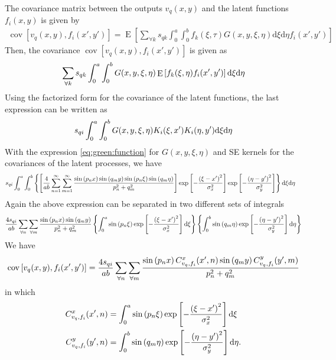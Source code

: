 \documentclass[a4paper,10pt]{article}
\newcommand{\dif}{\textrm{d}}
\DeclareMathOperator{\cov}{cov} \DeclareMathOperator{\ex}{E}
\begin{document}
The covariance matrix between the outputs $v_q(x,y)$ and the latent
functions  $f_i(x,y)$
is given by
\begin{align}
\cov\left[v_q(x,y),f_i(x',y')\right]=\ex\left[\sum_{\forall
k}s_{qk}\int_0^a\int_0^bf_k(\xi,\tau)G(x, y, \xi, \eta)\dif\xi\dif\eta f_i(x',y')\right]
\end{align}
Then, the covariance $\cov\left[v_q(x,y),f_i(x',y')\right]$ is given
as
\begin{align}\notag
\sum_{\forall k}s_{qk}\int_0^a\int_0^bG(x,y, \xi,\eta)\ex\left[f_k(\xi,\eta)f_i(x',y')\right]
\dif\xi\dif\eta
\end{align}
Using the factorized form for the covariance of the latent functions, the last expression can be written as
\begin{align}\notag
s_{qi}\int_0^a\int_0^bG(x,y, \xi,\eta)K_i(\xi,x')K_i(\eta,y')
\dif\xi\dif\eta
\end{align}
With the expression \eqref{eq:green:function} for $G(x, y, \xi,\eta)$ and SE kernels for the
covariances of the latent processes, we have
\begin{align}\notag
\begin{split}
s_{qi}\int_0^a\int_0^b&\left\{\left[
\frac{4}{ab}\sum_{n=1}^\infty
                  \sum_{m=1}^\infty\frac{\sin\left({p_n x}\right)
\sin\left(q_m y\right)\sin\left(p_n \xi\right)\sin\left(q_m \eta\right)}{p_n^2 + q_m^2}\right]
\exp\left[-\frac{\left(\xi-x'\right)^2}{\sigma^2_x}\right]\exp\left[-\frac{\left(\eta-y'\right)^2}{\sigma^2_y}\right]\right\}\dif\xi\dif\eta
\end{split}
\end{align}
Again the above expression can be separated in
two different sets of integrals
\begin{align}\notag
\frac{4s_{qi}}{ab} \sum_{\forall n}\sum_{\forall m} \frac{\sin\left({p_n x}\right)
\sin\left(q_m y\right)}{p_n^2 + q_m^2}
\left\{\int_0^a\sin\left(p_n\xi\right)
\exp\left[-\frac{\left(\xi-x'\right)^2}{\sigma^2_x}\right]\dif\xi\right\}
\left\{\int_0^b\sin\left(q_m\eta\right)
\exp\left[-\frac{\left(\eta-y'\right)^2}{\sigma^2_y}\right]\dif\eta\right\}
\end{align}
We have
\begin{align}\notag
\cov\left[v_q(x,y),f_i(x',y')\right]=\frac{4s_{qi}}{ab}
\sum_{\forall n}\sum_{\forall m} \frac{\sin\left({p_n x}\right) C^x_{v_q,f_i}(x',n)
\sin\left(q_m y\right) C^y_{v_q,f_i}(y',m)}{p_n^2 + q_m^2}
\end{align}
in which
\begin{align}\notag
C^x_{v_q,f_i}(x',n) &= \int_0^a\sin\left(p_n\xi\right)
\exp\left[-\frac{\left(\xi-x'\right)^2}{\sigma^2_x}\right]\dif\xi\\\notag
C^y_{v_q,f_i}(y',n) &= \int_0^b\sin\left(q_m\eta\right)
\exp\left[-\frac{\left(\eta-y'\right)^2}{\sigma^2_y}\right]\dif\eta.
\end{align}
\end{document}
